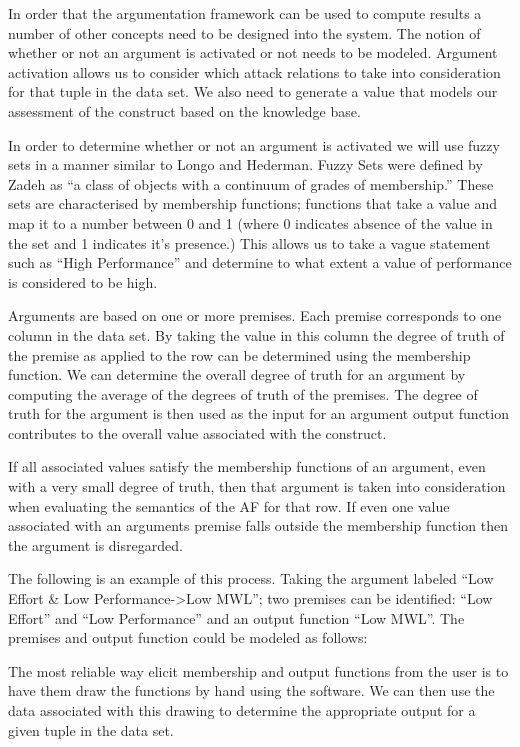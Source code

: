 In order that the argumentation framework can be used to compute results a number of other concepts need to be designed into the system. The notion of whether or not an argument is activated or not needs to be modeled. Argument activation allows us to consider which attack relations to take into consideration for that tuple in the data set. We also need to generate a value that models our assessment of the construct based on the knowledge base.

In order to determine whether or not an argument is activated we will use fuzzy sets in a manner similar to Longo and Hederman. Fuzzy Sets were defined by Zadeh as ``a class of objects with a continuum of grades of membership.''\cite{zadeh1965fuzzy} These sets are characterised by membership functions; functions that take a value and map it to a number between 0 and 1 (where 0 indicates absence of the value in the set and 1 indicates it's presence.) This allows us to take a vague statement such as ``High Performance'' and determine to what extent a value of performance is considered to be high.

Arguments are based on one or more premises. Each premise corresponds to one column in the data set. By taking the value in this column the degree of truth of the premise as applied to the row can be determined using the membership function. We can determine the overall degree of truth for an argument by computing the average of the degrees of truth of the premises. The degree of truth for the argument is then used as the input for an argument output function contributes to the overall value associated with the construct.

If all associated values satisfy the membership functions of an argument, even with a very small degree of truth, then that argument is taken into consideration when evaluating the semantics of the AF for that row. If even one value associated with an arguments premise falls outside the membership function then the argument is disregarded.

The following is an example of this process. Taking the argument labeled ``Low Effort & Low Performance->Low MWL''; two premises can be identified: ``Low Effort'' and ``Low Performance'' and an output function ``Low MWL''. The premises and output function could be modeled as follows:




The most reliable way elicit membership and output functions from the user is to have them draw the functions by hand using the software. We can then use the data associated with this drawing to determine the appropriate output for a given tuple in the data set.

